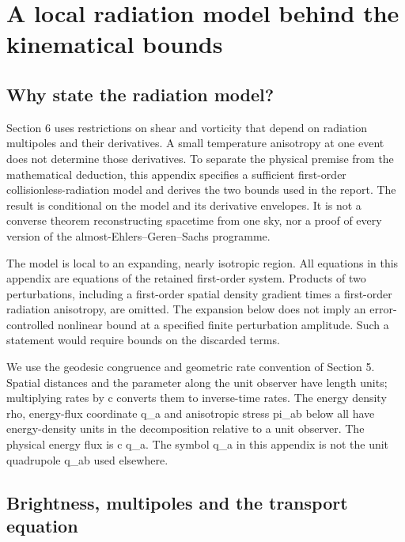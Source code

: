 \documentclass[
  11pt,
  a4paper]{article}
\begin{document}
\hypertarget{appendix-e.-a-local-radiation-model-behind-the-kinematical-bounds}{%
\section{A local radiation model behind the kinematical bounds}\label{appendix-e.-a-local-radiation-model-behind-the-kinematical-bounds}}

\hypertarget{e.1-why-state-the-radiation-model}{%
\subsection{Why state the radiation model?}\label{e.1-why-state-the-radiation-model}}

Section 6 uses restrictions on shear and vorticity that depend on radiation multipoles and their derivatives. A small temperature anisotropy at one event does not determine those derivatives. To separate the physical premise from the mathematical deduction, this appendix specifies a sufficient first-order collisionless-radiation model and derives the two bounds used in the report. The result is conditional on the model and its derivative envelopes. It is not a converse theorem reconstructing spacetime from one sky, nor a proof of every version of the almost-Ehlers--Geren--Sachs programme.

The model is local to an expanding, nearly isotropic region. All equations in this appendix are equations of the retained first-order system. Products of two perturbations, including a first-order spatial density gradient times a first-order radiation anisotropy, are omitted. The expansion below does not imply an error-controlled nonlinear bound at a specified finite perturbation amplitude. Such a statement would require bounds on the discarded terms.

We use the geodesic congruence and geometric rate convention of Section 5. Spatial distances and the parameter along the unit observer have length units; multiplying rates by c converts them to inverse-time rates. The energy density rho, energy-flux coordinate q\_a and anisotropic stress pi\_ab below all have energy-density units in the decomposition relative to a unit observer. The physical energy flux is c q\_a. The symbol q\_a in this appendix is not the unit quadrupole q\_ab used elsewhere.

\hypertarget{e.2-brightness-multipoles-and-the-transport-equation}{%
\subsection{Brightness, multipoles and the transport equation}\label{e.2-brightness-multipoles-and-the-transport-equation}}
\end{document}
